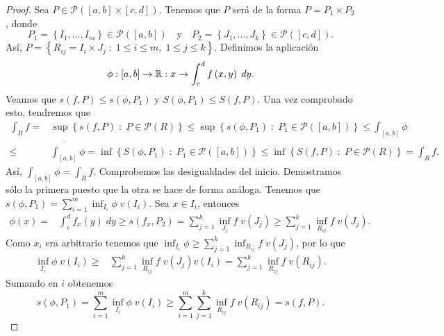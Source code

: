 \begin{proof}
	Sea $\displaystyle P \in \mathcal{P}\left(\left[a,b\right] \times\left[c,d\right] \right) $. Tenemos que $\displaystyle P $ será de la forma $\displaystyle P = P_{1} \times P_{2} $, donde 
	\[P_{1}= \left\{ I_{1}, \ldots, I_{m}\right\} \in \mathcal{P}\left(\left[a,b\right] \right)\quad \text{y} \quad P_{2} = \left\{ J_{1}, \ldots, J_{k}\right\} \in \mathcal{P}\left(\left[c,d\right] \right) .\]
	Así, $\displaystyle P = \left\{ R_{ij}=I_{i} \times J_{j} \; : \; 1 \leq i \leq m, \; 1 \leq j \leq k\right\}  $. Definimos la aplicación
	\[\phi : \left[a,b\right] \to \mathbb{R} : x \to \int^{d}_{c} f\left(x,y\right) \; dy .\]
	Veamos que $\displaystyle s\left(f,P\right)\leq s\left(\phi, P_{1}\right) $ y $\displaystyle S\left(\phi,P_{1}\right)\leq S\left(f,P\right) $. Una vez comprobado esto, tendremos que 
	\[
	\begin{split}
		\int _{R}f = & \sup \left\{ s\left(f,P\right) \; : \; P \in \mathcal{P}\left(R\right)\right\} \leq \sup \left\{ s\left(\phi, P_{1}\right) \; : \; P_{1} \in \mathcal{P}\left(\left[a,b\right] \right)\right\} \leq \int _{\left[a,b\right] }\phi \\
		\leq & \overline{\int _{[a,b]} }\phi = \inf \left\{ S\left(\phi, P_{1}\right) \; : \; P_{1} \in \mathcal{P}\left(\left[a,b\right] \right)\right\} \leq \inf \left\{ S\left(f,P\right)\; : \; P \in \mathcal{P}\left(R\right)\right\} =\int _{R}f  .
	\end{split}
	\]
	Así, $\displaystyle \int _{\left[a,b\right] }\phi =\int _{R}f $. Comprobemos las desigualdades del inicio. Demostramos sólo la primera puesto que la otra se hace de forma análoga. Tenemos que $\displaystyle s\left(\phi, P_{1}\right)=\sum^{m}_{i = 1}\inf_{I_{i}}\phi\; v\left(I_{i}\right) $. Sea $\displaystyle x \in I_{i} $, entonces
	\[
	\begin{split}
		\phi\left(x\right) = & \int^{d}_{c} f_{x}\left(y\right) \; dy \geq s\left(f_{x}, P_{2}\right)=\sum^{k}_{j = 1} \inf_{J_{j}}f \; v\left(J_{j}\right)\geq \sum^{k}_{j = 1}\inf_{R_{ij}}f\; v\left(J_{j}\right) .
	\end{split}
	\]
	Como $\displaystyle x_{i} $ era arbitrario tenemos que $\displaystyle \inf_{I_{i}}\phi \geq  \sum^{k}_{j = 1}\inf_{R_{ij}}f \; v\left(J_{j}\right) $, por lo que
	\[
	\begin{split}
		\inf_{I_{i}}\phi \;v\left(I_{i}\right) \geq & \sum^{k}_{j = 1}\inf_{R_{ij}}f \; v\left(J_{j}\right)v\left(I_{i}\right) = \sum^{k}_{j = 1}\inf_{R_{ij}}f \; v\left(R_{ij}\right)	.
	\end{split}
	\]
	Sumando en $\displaystyle i $ obtenemos
\[s\left(\phi, P_{1}\right)=\sum^{m}_{i = 1}\inf_{I_{i}}\phi \; v\left(I_{i}\right)\geq \sum^{m}_{i = 1}\sum^{k}_{j = 1}\inf_{R_{ij}}f \; v\left(R_{ij}\right)=s\left(f,P\right) .\]
\end{proof}

